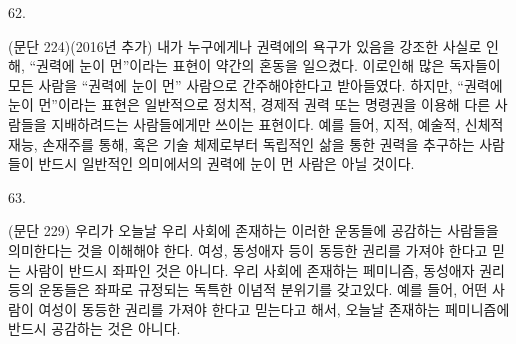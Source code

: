 \documentclass[11pt,a4paper]{article}
\begin{document}
\begin{multicols}{2}
\hypertarget{62}{62.} (문단 224)(2016년 추가) 내가 누구에게나 권력에의 욕구가 있음을 강조한 사실로 인해, “권력에  눈이 먼”이라는 표현이 약간의 혼동을 일으켰다. 이로인해 많은 독자들이 모든 사람을 “권력에 눈이 먼”  사람으로 간주해야한다고 받아들였다. 하지만, “권력에 눈이 먼”이라는 표현은 일반적으로 정치적,  경제적 권력 또는 명령권을 이용해 다른 사람들을 지배하려드는 사람들에게만 쓰이는 표현이다. 예를  들어, 지적, 예술적, 신체적 재능, 손재주를 통해, 혹은 기술 체제로부터 독립적인 삶을 통한 권력을 추구하는 사람들이 반드시 일반적인 의미에서의 권력에 눈이 먼 사람은 아닐 것이다. 


\hypertarget{63}{63.} (문단 229) 우리가 오늘날 우리 사회에 존재하는 이러한 운동들에 공감하는 사람들을 의미한다는  것을 이해해야 한다. 여성, 동성애자 등이 동등한 권리를 가져야 한다고 믿는 사람이 반드시 좌파인 것은  아니다. 우리 사회에 존재하는 페미니즘, 동성애자 권리 등의 운동들은 좌파로 규정되는 독특한 이념적  분위기를 갖고있다. 예를 들어, 어떤 사람이 여성이 동등한 권리를 가져야 한다고 믿는다고 해서, 오늘날  존재하는 페미니즘에 반드시 공감하는 것은 아니다. 
\end{multicols}
\end{document}
